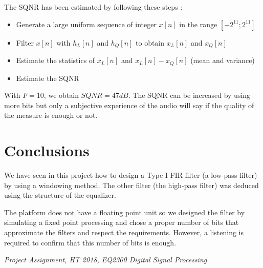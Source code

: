 \documentclass[a4paper]{article}
\begin{document}
The SQNR has been estimated by following these steps :

\begin{itemize}
	\item Generate a large uniform sequence of integer $x[n]$ in the range $[-2^{11}; 2^{11}]$
	\item Filter $x[n]$ with $h_L[n]$ and $h_Q[n]$ to obtain $x_L[n]$ and $x_Q[n]$
	\item Estimate the statistics of $x_L[n]$ and $x_L[n] - x_Q[n]$ (mean and variance)
	\item Estimate the SQNR
\end{itemize}

With $F = 10$, we obtain $SQNR = 47dB$. The SQNR can be increased by using more bits but only a subjective experience of the audio will say if the quality of the measure is enough or not.

\section{Conclusions}
\label{sec:conclusions}
We have seen in this project how to design a Type I FIR filter (a low-pass filter) by using a windowing method. The other filter (the high-pass filter) was deduced using the structure of the equalizer.

The platform does not have a floating point unit so we designed the filter by simulating a fixed point processing and chose a proper number of bits that approximate the filters and respect the requirements. However, a listening is required to confirm that this number of bits is enough.



\begin{thebibliography}{99}
 \textsl{Project Assignment, HT 2018, EQ2300 Digital Signal Processing}
\end{thebibliography}
\end{document}
